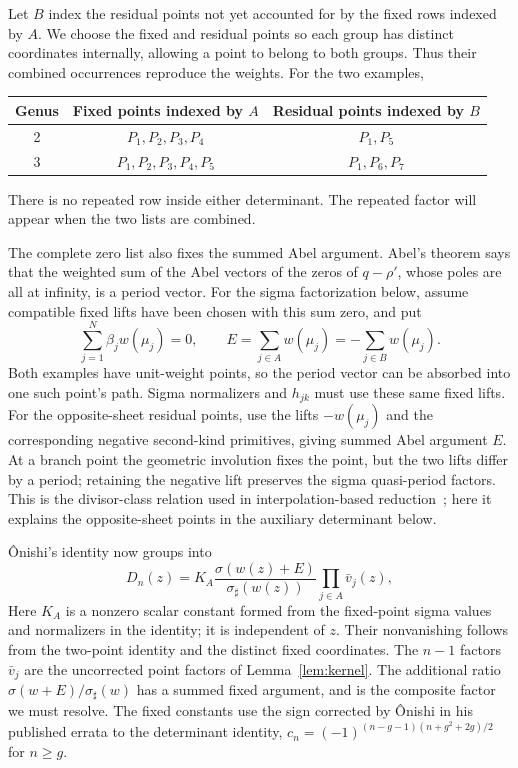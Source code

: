 \documentclass[11pt]{article}
\begin{document}
Let $B$ index the residual points not yet accounted for by the fixed rows indexed by $A$. We choose the fixed and residual points so each group has distinct coordinates internally, allowing a point to belong to both groups. Thus their combined occurrences reproduce the weights. For the two examples,
\begin{center}
\begin{tabular}{ccc}\toprule
Genus & Fixed points indexed by $A$ & Residual points indexed by $B$\\\midrule
2 & $P_1,P_2,P_3,P_4$ & $P_1,P_5$\\
3 & $P_1,P_2,P_3,P_4,P_5$ & $P_1,P_6,P_7$\\
\bottomrule\end{tabular}
\end{center}
There is no repeated row inside either determinant. The repeated factor will appear when the two lists are combined.

The complete zero list also fixes the summed Abel argument. Abel's theorem says that the weighted sum of the Abel vectors of the zeros of $q-\rho'$, whose poles are all at infinity, is a period vector. For the sigma factorization below, assume compatible fixed lifts have been chosen with this sum zero, and put
\[
\sum_{j=1}^{N}\beta_jw(\mu_j)=0,\qquad
E=\sum_{j\in A}w(\mu_j)=-\sum_{j\in B}w(\mu_j).
\]
Both examples have unit-weight points, so the period vector can be absorbed into one such point's path. Sigma normalizers and $h_{jk}$ must use these same fixed lifts. For the opposite-sheet residual points, use the lifts $-w(\mu_j)$ and the corresponding negative second-kind primitives, giving summed Abel argument $E$. At a branch point the geometric involution fixes the point, but the two lifts differ by a period; retaining the negative lift preserves the sigma quasi-period factors. This is the divisor-class relation used in interpolation-based reduction~\cite{divisor-addition}; here it explains the opposite-sheet points in the auxiliary determinant below.

\^Onishi's identity \cite[Theorem~7.2]{onishi} now groups into
\begin{equation}\label{eq:onishi-composite}
D_n(z)=K_A\frac{\sigma(w(z)+E)}{\sigma_\sharp(w(z))}
                  \prod_{j\in A}\bar v_j(z),
\end{equation}
Here $K_A$ is a nonzero scalar constant formed from the fixed-point sigma values and normalizers in the identity; it is independent of $z$. Their nonvanishing follows from the two-point identity and the distinct fixed coordinates. The $n-1$ factors $\bar v_j$ are the uncorrected point factors of Lemma~\ref{lem:kernel}. The additional ratio $\sigma(w+E)/\sigma_\sharp(w)$ has a summed fixed argument, and is the composite factor we must resolve. The fixed constants use the sign corrected by \^Onishi in his published errata to the determinant identity, $c_n=(-1)^{(n-g-1)(n+g^2+2g)/2}$ for $n\ge g$.
\end{document}

